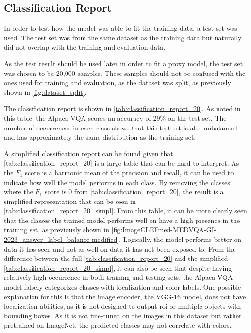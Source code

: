     \subsection{Classification Report}
        In order to test how the model was able to fit the training data, a test set was used. The test set was from the same dataset as the training data but naturally did not overlap with the training and evaluation data. 

        As the test result should be used later in order to fit a proxy model, the test set was chosen to be 20,000 samples. These samples should not be confused with the ones used for training and evaluation, as the dataset was split, as previously shown in \autoref{fig:dataset_split}.

        The classification report is shown in \autoref{tab:classification_report_20}. As noted in this table, the Alpaca-VQA scores an accuracy of 29\% on the test set. The number of occurrences in each class shows that this test set is also unbalanced and has approximately the same distribution as the training set.
        
        A simplified classification report can be found given that \autoref{tab:classification_report_20} is a large table that can be hard to interpret.
        As the $F_1$ score is a harmonic mean of the precision and recall, it can be used to indicate how well the model performs in each class. By removing the classes where the $F_1$ score is 0 from \autoref{tab:classification_report_20}, the result is a simplified representation that can be seen in \autoref{tab:classification_report_20_simpl}.
        From this table, it can be more clearly seen that the classes the trained model performs well on have a high presence in the training set, as previously shown in \autoref{fig:ImageCLEFmed-MEDVQA-GI-2023_answer_label_balance-modified}. Logically, the model performs better on data it has seen and not as well on data it has not been exposed to. From the difference between the full \autoref{tab:classification_report_20} and the simplified \autoref{tab:classification_report_20_simpl}, it can also be seen that despite having relatively high occurrence in both training and testing sets, the Alpaca-VQA model falsely categorizes classes with localization and color labels.
        One possible explanation for this is that the image encoder, the VGG-16 model, does not have localization abilities, as it is not designed to output \gls{roi} or multiple objects with bounding boxes. As it is not fine-tuned on the images in this dataset but rather pretrained on ImageNet, the predicted classes may not correlate with colors.
        
        

